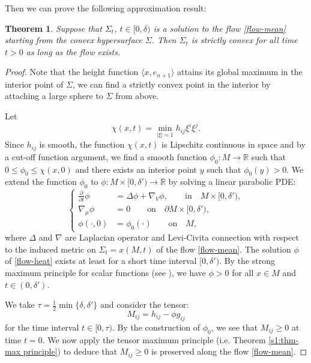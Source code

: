 \documentclass[11pt,reqno]{amsart}
\newtheorem{thm}{Theorem}[section]
\theoremstyle{definition}
\theoremstyle{remark}
\numberwithin{equation}{section}
\renewcommand{\(}{\left(}
\renewcommand{\)}{\right)}
\renewcommand{\-}{\overline}
\begin{document}
	Then we can prove the following approximation result:
	\begin{thm}
		Suppose that $\Sigma_t$, $t\in [0,\delta)$ is a solution to the flow \eqref{flow-mean} starting from the convex hypersurface $\Sigma$. Then $\Sigma_t$ is strictly convex for all time $t>0$ as long as the flow exists.
	\end{thm}
	\begin{proof}
		Note that the height function $\langle x,e_{n+1}\rangle$ attains its global maximum in the interior point of $\Sigma$, we can find a strictly convex point in the interior by attaching a large sphere to $\Sigma$ from above.
		
		Let
		\begin{equation*}
			\chi(x,t)=\min_{|\xi|=1}{h_{ij}\xi^i\xi^j}.
		\end{equation*}
		Since $h_{ij}$ is smooth, the function $\chi(x,t)$ is Lipschitz continuous in space and by a cut-off function argument, we find a smooth function $\phi_0:M\to\mathbb{R}$ such that $0\leq\phi_0\leq\chi(x,0)$ and there exists an interior point $y$ such that $\phi_0(y)>0$. We extend the function $\phi_0$ to $\phi:M\times[0,\delta')\to\mathbb{R}$ by solving a linear parabolic PDE:
		\begin{equation}\label{flow-heat}
			\left\{\begin{aligned}
				\frac{\partial}{\partial t}\phi&=\Delta\phi+\nabla_V\phi, \qquad \text{in}\quad M \times[0,\delta'),\\
				\nabla_{\mu}\phi&=0 \qquad \text{on}\quad \partial M \times[0,\delta'),\\
				\phi(\cdot,0)&={\phi}_0(\cdot) \qquad \text{on} \quad M,
			\end{aligned}\right.
		\end{equation}
		where $\Delta$ and $\nabla$ are Laplacian operator and Levi-Civita connection with respect to the induced  metric on $\Sigma_t=x(M,t)$ of the flow \eqref{flow-mean}. The solution $\phi$ of \eqref{flow-heat} exists at least for a short time interval $[0,\delta')$. By the strong maximum principle for scalar functions (see \cite[Corollary 3.2]{Stahl1996-2}), we have $\phi>0$ for all $x\in M$ and $t\in(0,\delta')$.

We take $\tau=\frac{1}{2}\min\{\delta,\delta'\}$ and consider the tensor:
		\begin{equation}
			M_{ij}=h_{ij}-\phi g_{ij}
		\end{equation}
		for the time interval $t\in[0,\tau)$. By the construction of $\phi_0$, we see that $M_{ij}\geq 0$ at time $t=0$. We now apply the tensor maximum principle (i.e. Theorem \ref{s1:thm-max principle}) to deduce that $M_{ij}\geq 0$ is preserved along the flow \eqref{flow-mean}.
		

\end{proof}
\end{document}
